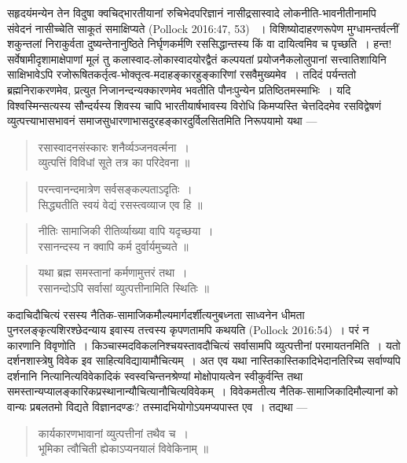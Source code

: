 {\dev सहृदयंमन्येन तेन विदुषा क्वचिद्भारतीयानां रुचिभेदपरिज्ञानं नासीद्रसास्वादे लोकनीति-भाव\-नीतीनामपि संवेदनं नासीच्चेति साकूतं समाक्षिप्यते} (Pollock 2016:47, 53) {\dev~। विशि\-ष्योदाहरणरूपेण मुग्धामन्तर्वत्नीं शकुन्तलां निराकुर्वता दुष्यन्तेनानुष्ठिते निर्घृणकर्मणि रससि\-द्धान्तस्य किं वा दायित्वमिव च पृच्छति~। हन्त! सर्वेषामीदृशामाक्षेपाणां मूलं तु कलास्वाद-लोकास्वादयोरद्वैतं कल्पयतां प्रयोजनैकलोलुपानां सत्त्वातिशायिनि साक्षिभावेऽपि रजोरू\-षितकर्तृत्व-भोक्तृत्व-मदाहङ्कारहुङ्कारिणां रसवैमुख्यमेव~। तदिदं पर्यन्ततो ब्रह्मनिराकरणमेव, प्रत्युत निजानन्दन्यक्कारणमेव भवतीति पौनःपुन्येन प्रतिष्ठितमस्माभिः~। यदि विश्वस्मिन्स\-त्यस्य सौन्दर्यस्य शिवस्य चापि भारतीयार्षभावस्य विरोधि किमप्यस्ति चेत्तदिदमेव रसविद्वे\-षणं व्युत्पत्त्याभासभावनं समाजसुधारणाभासदुरहङ्कारदुर्विलसितमिति निरूपयामो यथा ---}        
\begin{quote}
{\dev रसास्वादनसंस्कारः शनैर्व्यञ्जनवर्त्मना~।}\\
{\dev व्युत्पत्तिं विविधां सूते तत्र का परिदेवना ॥}
\end{quote}
\begin{quote}
{\dev परन्त्वानन्दमात्रेण सर्वसङ्कल्पताऽदृतिः~।}\\
{\dev सिद्ध्यतीति स्वयं वेद्यं रसस्त्वव्याज एव हि ॥}
\end{quote}
\begin{quote}
{\dev नीतिः सामाजिकी रीतिर्व्याख्या वापि यदृच्छया~।}\\
{\dev रसानन्दस्य न क्वापि कर्म दुर्वार्यमुच्यते ॥}
\end{quote}
\begin{quote}
{\dev यथा ब्रह्म समस्तानां कर्मणामुत्तरं तथा~।}\\
{\dev रसानन्दोऽपि सर्वासां व्युत्पत्तीनामिति स्थितिः ॥}
\end{quote}

{\dev कदाचिदौचित्यं रसस्य नैतिक-सामाजिकमौल्यमार्गदर्शीत्यनुबध्नता साध्वनेन धीमता पुन\-रलङ्कृत्यशिरश्छेदन्याय इवास्य तत्त्वस्य कृपणतामपि कथयति} (Pollock 2016:54){\dev~। परं न कारणानि विवृणोति~। किञ्चास्मदविकलनिश्चयस्तावदौचित्यं सर्वासामपि व्युत्पत्तीनां परमायत\-नमिति~। यतो दर्शनशास्त्रेषु विवेक इव साहित्यविद्यायामौचित्यम्~। अत एव यथा नास्ति\-कास्तिकादिभेदानतिरिच्य सर्वाण्यपि दर्शनानि नित्यानित्यविवेकादिकं स्वस्वचिन्तन\-श्रेण्यां मोक्षोपायत्वेन स्वीकुर्वन्ति तथा समस्तान्यप्यालङ्कारिकप्रस्थानान्यौचित्यानौचित्य\-विवेकम्~। विवेकमतीत्य नैतिक-सामाजिकादिमौल्यानां को वान्यः प्रबलतमो विद्यते विज्ञान\-दण्डः? तस्मादभियोगोऽयमप्यपास्त एव~। तद्यथा ---} 
\begin{quote}
{\dev कार्यकारणभावानां व्युत्पत्तीनां तथैव च~।}\\
{\dev भूमिका त्वौचिती ह्येकाऽप्यनयालं विवेकिनाम् ॥}
\end{quote}

